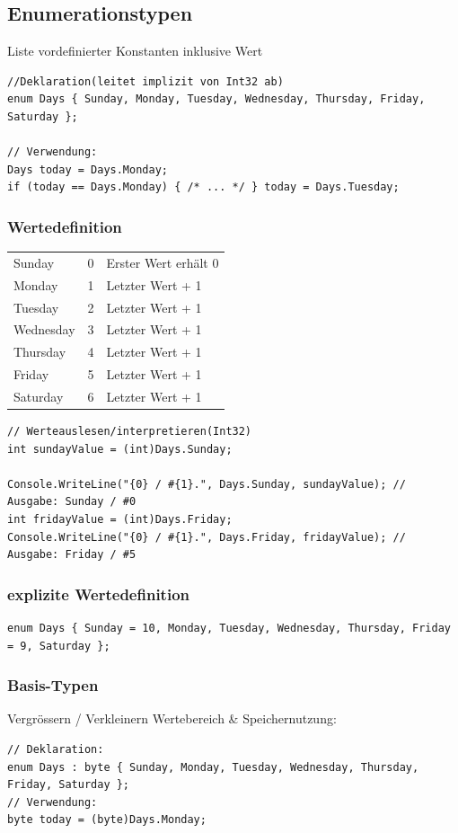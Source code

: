 \subsection{Enumerationstypen}
Liste vordefinierter Konstanten inklusive Wert
\begin{lstlisting}
//Deklaration(leitet implizit von Int32 ab)
enum Days { Sunday, Monday, Tuesday, Wednesday, Thursday, Friday, Saturday };

// Verwendung:
Days today = Days.Monday;
if (today == Days.Monday) { /* ... */ } today = Days.Tuesday;
\end{lstlisting}

\subsubsection{Wertedefinition}
\begin{tabular}{l | l | l}
    Sunday&0&Erster Wert erhält 0\\
    Monday&1&Letzter Wert + 1\\
    Tuesday&2&Letzter Wert + 1\\
    Wednesday&3&Letzter Wert + 1\\
    Thursday&4&Letzter Wert + 1\\
    Friday&5&Letzter Wert + 1\\
    Saturday&6&Letzter Wert + 1\\
\end{tabular}
\begin{lstlisting}
// Werteauslesen/interpretieren(Int32)
int sundayValue = (int)Days.Sunday;

Console.WriteLine("{0} / #{1}.", Days.Sunday, sundayValue); // Ausgabe: Sunday / #0
int fridayValue = (int)Days.Friday;
Console.WriteLine("{0} / #{1}.", Days.Friday, fridayValue); // Ausgabe: Friday / #5
\end{lstlisting}

\subsubsection{explizite Wertedefinition}
\begin{lstlisting}
enum Days { Sunday = 10, Monday, Tuesday, Wednesday, Thursday, Friday = 9, Saturday };
\end{lstlisting}

\subsubsection{Basis-Typen}
Vergrössern / Verkleinern Wertebereich \& Speichernutzung:
\begin{lstlisting}
// Deklaration:
enum Days : byte { Sunday, Monday, Tuesday, Wednesday, Thursday, Friday, Saturday };
// Verwendung:
byte today = (byte)Days.Monday;
\end{lstlisting}

